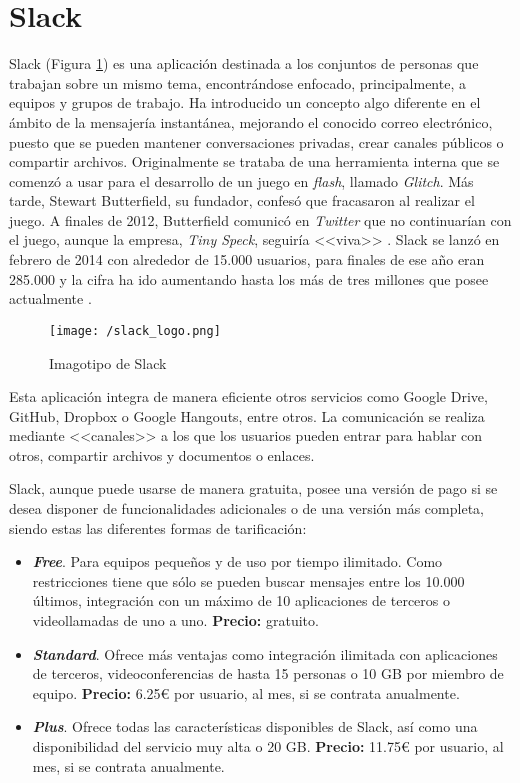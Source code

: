 \section{Slack}
\label{sec:slack}

Slack (Figura \ref{fig:slack}) es una aplicación destinada a los conjuntos de personas que trabajan sobre un mismo tema, encontrándose enfocado, principalmente, a equipos y grupos de trabajo. Ha introducido un concepto algo diferente en el ámbito de la mensajería instantánea, mejorando el conocido correo electrónico, puesto que se pueden mantener conversaciones privadas, crear canales públicos o compartir archivos. Originalmente se trataba de una herramienta interna que se comenzó a usar para el desarrollo de un juego en \textit{flash}, llamado \textit{Glitch}. Más tarde, Stewart Butterfield, su fundador, confesó que fracasaron al realizar el juego. A finales de 2012, Butterfield comunicó en \textit{Twitter} que no continuarían con el juego, aunque la empresa, \textit{Tiny Speck}, seguiría <<viva>> \cite{Thomas2015}. Slack se lanzó en febrero de 2014 con alrededor de 15.000 usuarios, para finales de ese año eran 285.000 y la cifra ha ido aumentando hasta los más de tres millones que posee actualmente \cite{PyMEs2017}.

\begin{figure}[!h]
	\begin{center}
		\texttt{[image: /slack\_logo.png]}
		\caption{Imagotipo de Slack}
		\label{fig:slack}
	\end{center}
\end{figure}

Esta aplicación integra de manera eficiente otros servicios como Google Drive, GitHub, Dropbox o Google Hangouts, entre otros. La comunicación se realiza mediante <<canales>> a los que los usuarios pueden entrar para hablar con otros, compartir archivos y documentos o enlaces.

\clearpage

Slack, aunque puede usarse de manera gratuita, posee una versión de pago si se desea disponer de funcionalidades adicionales o de una versión más completa, siendo estas las diferentes formas de tarificación:

\begin{itemize}
	\item \textbf{\textit{Free}}. Para equipos pequeños y de uso por tiempo ilimitado. Como restricciones tiene que sólo se pueden buscar mensajes entre los 10.000 últimos, integración con un máximo de 10 aplicaciones de terceros o videollamadas de uno a uno. \textbf{Precio:} gratuito.
	\item \textbf{\textit{Standard}}. Ofrece más ventajas como integración ilimitada con aplicaciones de terceros, videoconferencias de hasta 15 personas o 10 \acs{GB} por miembro de equipo. \textbf{Precio:} 6.25\euro{} por usuario, al mes, si se contrata anualmente.
	\item \textbf{\textit{Plus}}. Ofrece todas las características disponibles de Slack, así como una disponibilidad del servicio muy alta o 20 \acs{GB}. \textbf{Precio:} 11.75\euro{} por usuario, al mes, si se contrata anualmente.
\end{itemize}

